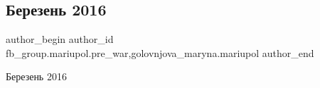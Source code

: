  
 
 
 
 

\subsection{Березень 2016}
\label{sec:02_03_2023.fb.fb_group.mariupol.pre_war.1.berezen_2016}
 
\ifcmt
 author_begin
   author_id fb_group.mariupol.pre_war,golovnjova_maryna.mariupol
 author_end
\fi

Березень 2016

